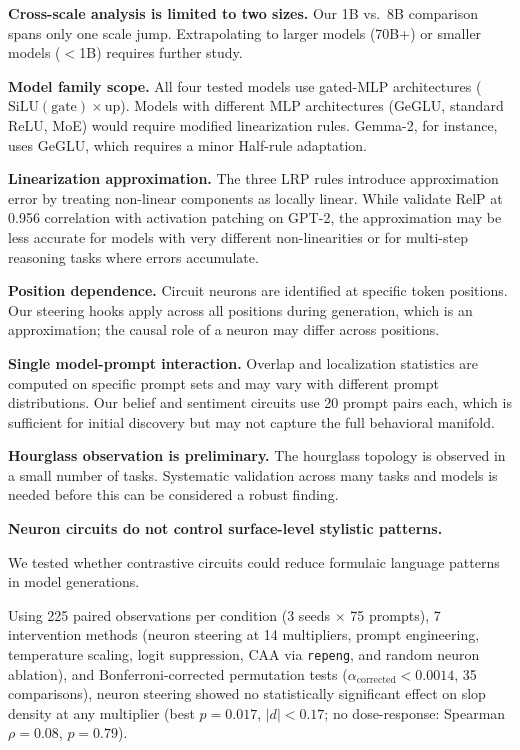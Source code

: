\documentclass[11pt]{article}
\begin{document}
\textbf{Cross-scale analysis is limited to two sizes.}
Our 1B vs.\ 8B comparison spans only one scale jump.
Extrapolating to larger models (70B+) or smaller models ($<$1B) requires further study.

\textbf{Model family scope.}
All four tested models use gated-MLP architectures ($\text{SiLU}(\text{gate}) \times \text{up}$).
Models with different MLP architectures (GeGLU, standard ReLU, MoE) would require modified linearization rules.
Gemma-2, for instance, uses GeGLU, which requires a minor Half-rule adaptation.

\textbf{Linearization approximation.}
The three LRP rules introduce approximation error by treating non-linear components as locally linear.
While \citet{jafari2025relp} validate RelP at 0.956 correlation with activation patching on GPT-2, the approximation may be less accurate for models with very different non-linearities or for multi-step reasoning tasks where errors accumulate.

\textbf{Position dependence.}
Circuit neurons are identified at specific token positions.
Our steering hooks apply across all positions during generation, which is an approximation; the causal role of a neuron may differ across positions.

\textbf{Single model-prompt interaction.}
Overlap and localization statistics are computed on specific prompt sets and may vary with different prompt distributions.
Our belief and sentiment circuits use 20 prompt pairs each, which is sufficient for initial discovery but may not capture the full behavioral manifold.

\textbf{Hourglass observation is preliminary.}
The hourglass topology is observed in a small number of tasks.
Systematic validation across many tasks and models is needed before this can be considered a robust finding.

\textbf{Neuron circuits do not control surface-level stylistic patterns.}

We tested whether contrastive circuits could reduce formulaic language patterns in model generations.

Using 225 paired observations per condition (3 seeds $\times$ 75 prompts), 7 intervention methods (neuron steering at 14 multipliers, prompt engineering, temperature scaling, logit suppression, CAA via \texttt{repeng}, and random neuron ablation), and Bonferroni-corrected permutation tests ($\alpha_{\text{corrected}} < 0.0014$, 35 comparisons), neuron steering showed no statistically significant effect on slop density at any multiplier (best $p = 0.017$, $|d| < 0.17$; no dose-response: Spearman $\rho = 0.08$, $p = 0.79$).
\end{document}
